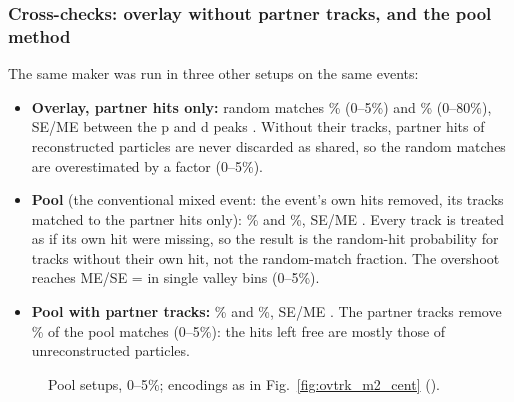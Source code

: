 
\subsubsection{Cross-checks: overlay without partner tracks, and the pool method}
\label{sec:mupool}
The same maker was run in three other setups on the same events:
\begin{itemize}
\item \textbf{Overlay, partner hits only:} random matches \ovFrCi\% (0--5\%) and \ovFrAll\% (0--80\%), SE/ME between the p and
  d peaks \ovHiCi. Without their tracks, partner hits of reconstructed particles are never discarded as shared, so the
  random matches are overestimated by a factor \ovHitsOnlyFactor{} (0--5\%).
\item \textbf{Pool} (the conventional mixed event: the event's own hits removed, its tracks matched to the partner hits only):
  \poolFrCi\% and \poolFrAll\%, SE/ME \poolHiCi. Every track is treated as if its own hit were missing, so the result is
  the random-hit probability for tracks without their own hit, not the random-match fraction. The overshoot reaches
  ME/SE = \poolVmaxCi{} in single valley bins (0--5\%).
\item \textbf{Pool with partner tracks:} \pooltFrCi\% and \pooltFrAll\%, SE/ME \pooltHiCi. The partner tracks remove
  \poolTrkRemoved\% of the pool matches (0--5\%): the hits left free are mostly those of unreconstructed particles.
\end{itemize}

\begin{figure}[H]
\centering
{}
\caption{Pool setups, 0--5\%; encodings as in Fig.~\ref{fig:ovtrk_m2_cent} ().}
\end{figure}

